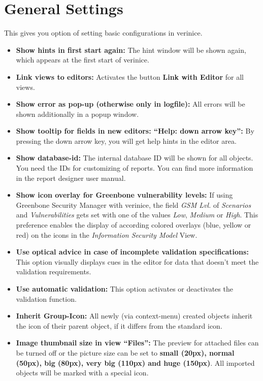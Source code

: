 \documentclass[a4paper,10pt]{book}
\begin{document}
\section{General Settings}
This gives you option of setting basic configurations in verinice.
\begin{itemize}
\item \textbf{Show hints in first start again:}
   The hint window will be shown again, which appears at the first start of verinice.
\item \textbf{Link views to editors:}
   Activates the button \textbf{Link with Editor} for all views.
\item \textbf{Show error as pop-up (otherwise only in logfile):}
   All errors will be shown additionally in a popup window.
\item \textbf{Show tooltip for fields in new editors: ``Help: down arrow key'':}
   By pressing the down arrow key, you will get help hints in the editor area.
\item \textbf{Show database-id:}
   The internal database ID will be shown for all objects. You need the IDs for customizing of reports. You can find more information in the report designer user manual.
\item \textbf{Show icon overlay for Greenbone vulnerability levels:} If using
  Greenbone Security Manager with verinice, the field {\em GSM Lvl.} of
  {\em Scenarios} and {\em Vulnerabilities} gets set with one of the values
  {\em Low}, {\em Medium} or {\em High}. This preference enables the display
  of according colored overlays (blue, yellow or red) on the
  icons in the {\em Information Security Model} View.
\item \textbf{Use optical advice in case of incomplete validation specifications:}
   This option visually displays cues in the editor for data that doesn't meet the validation requirements.
\item \textbf{Use automatic validation:}
   This option activates or deactivates the validation function.
\item \textbf{Inherit Group-Icon:}
   All newly (via context-menu) created objects inherit the icon of their parent object, if it differs from the standard icon.
\item \textbf{Image thumbnail size in view ``Files'':}
   The preview for attached files can be turned off or the picture size can be set to \textbf{small (20px), normal (50px), big (80px),
   very big (110px) and huge (150px)}.
   All imported objects will be marked with a special icon.

\end{itemize}
\end{document}
